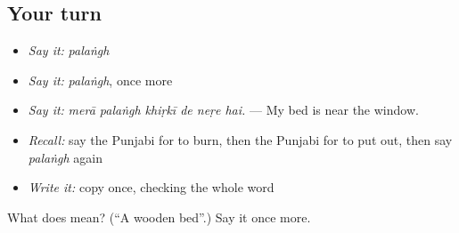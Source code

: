 \subsection*{Your turn}
\begin{itemize}
\raggedright
  \item \emph{Say it:} \emph{palaṅgh}
  \item \emph{Say it:} \emph{palaṅgh}, once more
  \item \emph{Say it:} \emph{merā palaṅgh khiṛkī de neṛe hai.} — My bed is near the window.
  \item \emph{Recall:} say the Punjabi for to burn, then the Punjabi for to put out, then say \emph{palaṅgh} again
  \item \emph{Write it:} copy \textbf{} once, checking the whole word
\end{itemize}

\begin{tcolorbox}[breakable,colback=teal!4,colframe=teal!35!black,title={Before you move on}]
What does  mean? (\textquotedblleft{}A wooden bed\textquotedblright{}.) Say it once more.
\end{tcolorbox}

